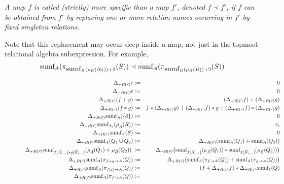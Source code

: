 {\begin{definition}\em
A map $f$ is called (strictly) {\em more specific than}\/ a map $f'$,
denoted $f \prec f'$, if $f$ can be obtained from $f'$ by replacing
one or more relation names occurring in $f'$ by fixed singleton relations.
\end{definition}


Note that this replacement may occur deep inside a map, not just in the topmost
relational algebra subexpression. For example,
\[
\mbox{sumf}_A(\pi_{\mbox{sumf}_B(\rho_B({\langle b\rangle})) + 2}(S))
\prec
\mbox{sumf}_A(\pi_{\mbox{sumf}_B(\rho_B(R)) + 2}(S))
\]


\begin{figure*}[t!]
\begin{eqnarray*}
\Delta_{+R(\vec{r})} c       &:=& 0 \\
\Delta_{+R(\vec{r})} x       &:=& 0 \\
\Delta_{+R(\vec{r})} (f + g) &:=&  (\Delta_{+R(\vec{r})} f) + (\Delta_{+R(\vec{r})} g) \\
\Delta_{+R(\vec{r})} (f * g) &:=& f * (\Delta_{+R(\vec{r})} g) 
                              +   (\Delta_{+R(\vec{r})} f) * g                        
                              +   (\Delta_{+R(\vec{r})} f) * (\Delta_{+R(\vec{r})} g)
\\
\Delta_{+R(\vec{r})} \algsumf_A(\{ \vec{a} \}) &:=& 0
\\
\Delta_{+R(\vec{r})} \algsumf_{A_i}(\rho_{\vec{A}}(R)) &:=& r_i
\\
\Delta_{+R(\vec{r})} \algsumf_A(S) &:=& 0
\\
\Delta_{+R(\vec{r})}  \algsumf_A(Q_1 \cup Q_2) &:=&
\Delta_{+R(\vec{r})} (\algsumf_A(Q_1) + \algsumf_A(Q_2))
\\
\Delta_{+R(\vec{r})} \algsumf_{f[\vec{A};\dots] * g[\vec{B};\dots]}(\rho_{\vec{A}}(Q_1) \times \rho_{\vec{B}}(Q_2)) \; &:=&
\Delta_{+R(\vec{r})} \big( \algsumf_{f[\vec{A};\dots]}(\rho_{\vec{A}}(Q_1))
    * \algsumf_{f[\vec{B};\dots]}(\rho_{\vec{B}}(Q_2)) \big)
\\
\Delta_{+R(\vec{r})} \algsumf_A(\pi_{f + g \rightarrow A}(Q)) &:=&
\Delta_{+R(\vec{r})} \big( \algsumf_A(\pi_{f \rightarrow A}(Q))
   + \algsumf_A(\pi_{g \rightarrow A}(Q)) \big)
\\
\Delta_{+R(\vec{r})} \algsumf_A(\pi_{f[\vec{x}] \rightarrow A}(Q)) &:=&
   (f + \Delta_{+R(\vec{r})} f)
   * \Delta_{+R(\vec{r})} \algsumf_1(Q)
\\
\Delta_{+R(\vec{r})} \algsumf_A(\pi_{f \rightarrow A}(Q)) &:=&

\end{eqnarray*}
\end{figure*}}
